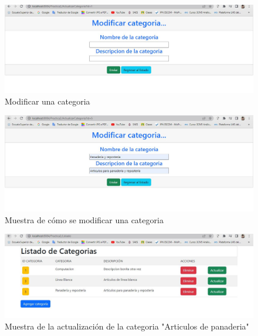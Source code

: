 \documentclass[10pt,a4paper]{article}
\begin{document}
\begin{figure}[H]
	\includegraphics[scale=.54]{Imagenes/modificar.jpg}
	\centering 
	\caption{Modificar una categoria}
\end{figure}


\begin{figure}[H]
	\includegraphics[scale=.54]{Imagenes/modificarValidacion.jpg}
	\centering \linebreak \linebreak 
	\caption{Muestra de cómo se modificar una categoria}
\end{figure} \hfill 

\begin{figure}[H]
	\includegraphics[scale=.54]{Imagenes/mostrarModificado.jpg}
	\centering \linebreak \linebreak 
	\caption{Muestra de la actualización de la categoria "Articulos de panaderia"}
\end{figure} \hfill 
\end{document}
